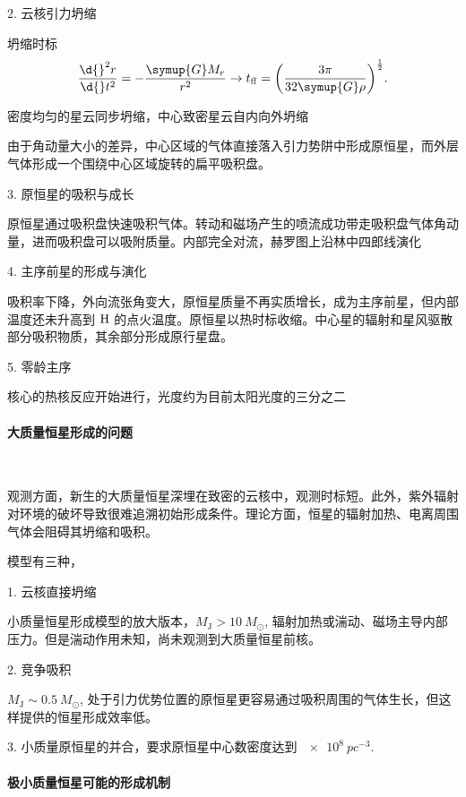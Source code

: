 \documentclass[../天体物理基础.tex]{subfiles}
\begin{document}
2. 云核引力坍缩

坍缩时标
\begin{equation}
\frac{\d{}^{2}r}{\d{}t^{2}}=-\frac{\symup{G}M_{r}}{r^{2}}\to t_{\mathrm{ff}}=\mleft(\frac{3\pi{}}{32\symup{G}\rho}\mright)^{\frac{1}{2}}.
\end{equation}

密度均匀的星云同步坍缩，中心致密星云自内向外坍缩

由于角动量大小的差异，中心区域的气体直接落入引力势阱中形成原恒星，而外层气体形成一个围绕中心区域旋转的扁平吸积盘。

3. 原恒星的吸积与成长

原恒星通过吸积盘快速吸积气体。转动和磁场产生的喷流成功带走吸积盘气体角动量，进而吸积盘可以吸附质量。内部完全对流，赫罗图上沿林中四郎线演化

4. 主序前星的形成与演化

吸积率下降，外向流张角变大，原恒星质量不再实质增长，成为主序前星，但内部温度还未升高到 $\ce{H}$ 的点火温度。原恒星以热时标收缩。中心星的辐射和星风驱散部分吸积物质，其余部分形成原行星盘。

5. 零龄主序

核心的热核反应开始进行，光度约为目前太阳光度的三分之二

\paragraph{大质量恒星形成的问题}~{}

观测方面，新生的大质量恒星深埋在致密的云核中，观测时标短。此外，紫外辐射对环境的破坏导致很难追溯初始形成条件。理论方面，恒星的辐射加热、电离周围气体会阻碍其坍缩和吸积。

模型有三种，

1. 云核直接坍缩

小质量恒星形成模型的放大版本，$M_{\mathrm{J}}>\qty{10}{M_{\odot}}$, 辐射加热或湍动、磁场主导内部压力。但是湍动作用未知，尚未观测到大质量恒星前核。

2. 竞争吸积

$M_{\mathrm{J}}\sim\qty{0.5}{M_{\odot}}$, 处于引力优势位置的原恒星更容易通过吸积周围的气体生长，但这样提供的恒星形成效率低。

3. 小质量原恒星的并合，要求原恒星中心数密度达到 $\qty{e8}{pc^{-3}}$.

\paragraph{极小质量恒星可能的形成机制}~{}
\end{document}
